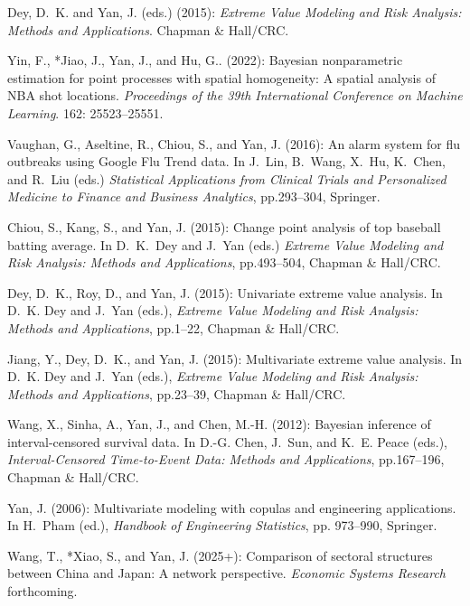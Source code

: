 \documentclass[Statistics]{vita}
\begin{document}
\begin{vita}
\begin{Publications}
\begin{Books}
  \item Dey, D.~K. and Yan, J. (eds.) (2015): {\em Extreme Value Modeling and Risk Analysis: Methods and Applications\/}. Chapman \& Hall/CRC.
  \end{Books}
  \begin{BookChapters}
  \item Yin, F., *Jiao, J., Yan, J., and Hu, G.. (2022): Bayesian nonparametric estimation for point processes with spatial homogeneity: A spatial analysis of NBA shot locations. {\em Proceedings of the 39th International Conference on Machine Learning}. 162: 25523--25551.
  \item *Vaughan, G., Aseltine, R., Chiou, S., and Yan, J. (2016): An alarm system for flu outbreaks using Google Flu Trend data. In J.~Lin, B.~Wang, X.~Hu, K.~Chen, and R.~Liu (eds.) {\em Statistical Applications from Clinical Trials and Personalized Medicine to Finance and Business Analytics}, pp.293--304, Springer.
  \item *Chiou, S., Kang, S., and Yan, J. (2015): Change point analysis of top baseball batting average. In D.~K.~Dey and J.~Yan (eds.) {\em Extreme Value Modeling and Risk Analysis: Methods and Applications\/}, pp.493--504, Chapman \& Hall/CRC.
  \item Dey, D.~K., Roy, D., and Yan, J. (2015): Univariate extreme value analysis. In D.~K. Dey and J.~Yan (eds.), {\em Extreme Value Modeling and Risk Analysis: Methods and Applications\/}, pp.1--22, Chapman \& Hall/CRC.
  \item *Jiang, Y., Dey, D.~K., and Yan, J. (2015): Multivariate extreme value analysis. In D.~K. Dey and J.~Yan (eds.), {\em Extreme Value Modeling and Risk Analysis: Methods and Applications\/}, pp.23--39, Chapman \& Hall/CRC.
  \item *Wang, X., Sinha, A., Yan, J., and Chen, M.-H. (2012): Bayesian inference of interval-censored survival data. In D.-G. Chen, J.~Sun, and  K.~E. Peace (eds.), {\em Interval-Censored Time-to-Event Data: {M}ethods and Applications\/}, pp.167--196, Chapman \& Hall/CRC.
  \item Yan, J. (2006): Multivariate modeling with copulas and engineering applications. In H.~Pham (ed.), {\em Handbook of Engineering Statistics\/}, pp. 973--990, Springer.
  \end{BookChapters}
  \begin{RefereedJournalArticles}
  \item *Wang, T., *Xiao, S., and Yan, J. (2025+): Comparison of sectoral structures between China and Japan: A network perspective. {\em Economic Systems Research\/} forthcoming.        

\end{RefereedJournalArticles}
\end{Publications}
\end{vita}
\end{document}
